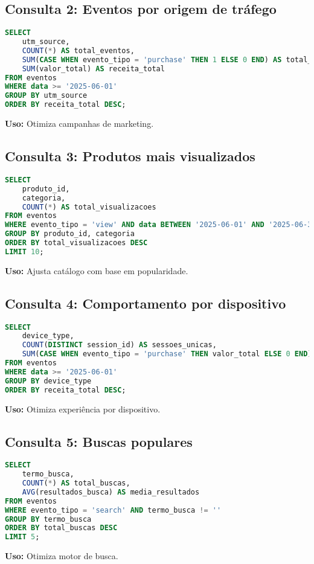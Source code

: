 \documentclass[a4paper,12pt]{article}
\begin{document}
\subsection{Consulta 2: Eventos por origem de tráfego}
\begin{lstlisting}[language=SQL]
SELECT 
    utm_source,
    COUNT(*) AS total_eventos,
    SUM(CASE WHEN evento_tipo = 'purchase' THEN 1 ELSE 0 END) AS total_compras,
    SUM(valor_total) AS receita_total
FROM eventos
WHERE data >= '2025-06-01'
GROUP BY utm_source
ORDER BY receita_total DESC;
\end{lstlisting}
\textbf{Uso:} Otimiza campanhas de marketing.

\subsection{Consulta 3: Produtos mais visualizados}
\begin{lstlisting}[language=SQL]
SELECT 
    produto_id,
    categoria,
    COUNT(*) AS total_visualizacoes
FROM eventos
WHERE evento_tipo = 'view' AND data BETWEEN '2025-06-01' AND '2025-06-30'
GROUP BY produto_id, categoria
ORDER BY total_visualizacoes DESC
LIMIT 10;
\end{lstlisting}
\textbf{Uso:} Ajusta catálogo com base em popularidade.

\subsection{Consulta 4: Comportamento por dispositivo}
\begin{lstlisting}[language=SQL]
SELECT 
    device_type,
    COUNT(DISTINCT session_id) AS sessoes_unicas,
    SUM(CASE WHEN evento_tipo = 'purchase' THEN valor_total ELSE 0 END) AS receita_total
FROM eventos
WHERE data >= '2025-06-01'
GROUP BY device_type
ORDER BY receita_total DESC;
\end{lstlisting}
\textbf{Uso:} Otimiza experiência por dispositivo.

\subsection{Consulta 5: Buscas populares}
\begin{lstlisting}[language=SQL]
SELECT 
    termo_busca,
    COUNT(*) AS total_buscas,
    AVG(resultados_busca) AS media_resultados
FROM eventos
WHERE evento_tipo = 'search' AND termo_busca != ''
GROUP BY termo_busca
ORDER BY total_buscas DESC
LIMIT 5;
\end{lstlisting}
\textbf{Uso:} Otimiza motor de busca.
\end{document}
